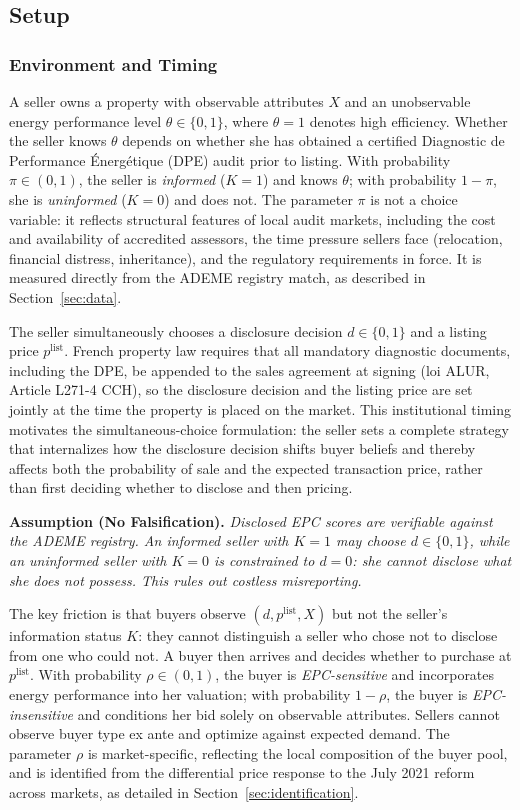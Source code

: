 \subsection{Setup}
\label{ss:model_setup}

\subsubsection{Environment and Timing}

A seller owns a property with observable attributes $X$ and an unobservable energy performance level $\theta \in \{0,1\}$, where $\theta=1$ denotes high efficiency. Whether the seller knows $\theta$ depends on whether she has obtained a certified Diagnostic de Performance \'{E}nerg\'{e}tique (DPE) audit prior to listing. With probability $\pi\in(0,1)$, the seller is \emph{informed} ($K=1$) and knows $\theta$; with probability $1-\pi$, she is \emph{uninformed} ($K=0$) and does not. The parameter $\pi$ is not a choice variable: it reflects structural features of local audit markets, including the cost and availability of accredited assessors, the time pressure sellers face (relocation, financial distress, inheritance), and the regulatory requirements in force. It is measured directly from the ADEME registry match, as described in Section~\ref{sec:data}.

The seller simultaneously chooses a disclosure decision $d\in\{0,1\}$ and a listing price $p^{\text{list}}$. French property law requires that all mandatory diagnostic documents, including the DPE, be appended to the sales agreement at signing (loi ALUR, Article L271-4 CCH), so the disclosure decision and the listing price are set jointly at the time the property is placed on the market. This institutional timing motivates the simultaneous-choice formulation: the seller sets a complete strategy that internalizes how the disclosure decision shifts buyer beliefs and thereby affects both the probability of sale and the expected transaction price, rather than first deciding whether to disclose and then pricing.

\noindent\textbf{Assumption (No Falsification).} \textit{Disclosed EPC scores are verifiable against the ADEME registry. An informed seller with $K=1$ may choose $d\in\{0,1\}$, while an uninformed seller with $K=0$ is constrained to $d=0$: she cannot disclose what she does not possess. This rules out costless misreporting.}

\medskip
The key friction is that buyers observe $(d, p^{\text{list}}, X)$ but not the seller's information status $K$: they cannot distinguish a seller who chose not to disclose from one who could not. A buyer then arrives and decides whether to purchase at $p^{\text{list}}$. With probability $\rho\in(0,1)$, the buyer is \emph{EPC-sensitive} and incorporates energy performance into her valuation; with probability $1-\rho$, the buyer is \emph{EPC-insensitive} and conditions her bid solely on observable attributes. Sellers cannot observe buyer type ex ante and optimize against expected demand. The parameter $\rho$ is market-specific, reflecting the local composition of the buyer pool, and is identified from the differential price response to the July 2021 reform across markets, as detailed in Section~\ref{sec:identification}.

